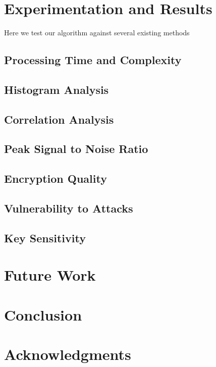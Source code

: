 \documentclass[conference]{IEEEtran}
\begin{document}
\section{Experimentation and Results}\label{sec:experimentation-and-results}

Here we test our algorithm against several existing methods

\subsection{Processing Time and Complexity}\label{subsec:processing-time-and-complexity}

\subsection{Histogram Analysis}\label{subsec:histogram-analysis}

\subsection{Correlation Analysis}\label{subsec:correlation-analysis}

\subsection{Peak Signal to Noise Ratio}\label{subsec:peak-signal-to-noise-ratio}

\subsection{Encryption Quality}\label{subsec:encryption-quality}

\subsection{Vulnerability to Attacks}\label{subsec:vulnerability-to-attacks}

\subsection{Key Sensitivity}\label{subsec:key-sensitivity}

\section{Future Work}\label{sec:future-work}

\section{Conclusion}\label{sec:conclusion}

\section{Acknowledgments}\label{sec:acknowledgments}



\end{document}
